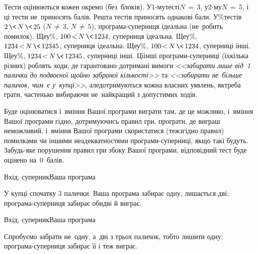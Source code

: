 \Scoring
Тести оцінюються кожен окремо (без~блоків).
У\nolinebreak[3] \mbox{1-му}\nolinebreak[2] тесті\nolinebreak[2] ${N\,{=}\,3}$, 
у\nolinebreak[3] \mbox{2-му}\nolinebreak[2] ${N\,{=}\,5}$,
і ці тести не~приносять балів.
Решта тестів приносять однакові бали.
У\%\nolinebreak[3] тестів ${2\,{\<}\,N\,{\<}\,25}$ (${N\,{\neq}\,3}$, ${N\,{\neq}\,5}$), програма-суперниця ідеальна (не~робить помилок).
Ще\nolinebreak[3] у\%, ${100\,{<}\,N\,{\<}\,1234}$, суперниця ідеальна.
Ще\nolinebreak[3] у\%, ${1234\,{<}\,N\,{\<}\,12345}$, суперниця ідеальна.
Ще\nolinebreak[3] у\%, ${100\,{<}\,N\,{\<}\,1234}$, суперниці інші.
Ще\nolinebreak[3] у\%, ${1234\,{<}\,N\,{\<}\,12345}$, суперниці інші. 
Ці\nolinebreak[3] інші програми-суперниці (їх\nolinebreak[3] кілька різних) роблять ходи, де гарантовано дотримані вимоги \textsl{<<забирати лише від~1 палички до подвоєної щойно забраної кількості>>} та \textsl{<<забирати не~більше паличок, чим~є у~купці>>}, але\nolinebreak[2] дотримуються кожна власних уявлень, як\nolinebreak[2] треба грати, частенько вибираючи не~найкра\-щий з допустимих ходів.

Буде оцінюватися і~вміння Вашої програми виграти там, де це %
можливо,
і~вміння Вашої програми 
гідно, дотримуючись правил гри,
програти, де виграш неможливий, 
і~вміння Вашої програми скористатися (теж\nolinebreak[2] згідно правил) помилками чи іншими неадекватностями програми-суперниці, якщо такі будуть.
За\nolinebreak[3] будь-яке порушення правил гри з\nolinebreak[3] боку Вашої програми, відповідний тест буде оцінено на~0~балів.

\Examples

\begin{exampleWidthsAndFileNames}{7em}{7em}{Вхід, суперник}{Ваша програма}
%
\end{exampleWidthsAndFileNames}

У купці спочатку 3 палички. Ваша програма забирає одну, лишається дві; програма-суперниця забирає обидві й виграє.

\noindent\hrulefill

\begin{exampleWidthsAndFileNames}{7em}{7em}{Вхід, суперник}{Ваша програма}
%
\end{exampleWidthsAndFileNames}

Спробуємо забрати не~одну, а~дві з трьох паличок, тобто лишити одну; програма-суперниця забирає її і теж виграє.

